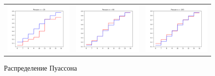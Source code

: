 	\begin{figure}[H]
		\centering
		\begin{tabular}{ccc}
			\includegraphics[width=55mm, height =0.25\textheight]{pics/emp_p_20.png}
			&
			\includegraphics[width=55mm, height =0.25\textheight]{pics/emp_p_60.png}
			&
			\includegraphics[width=55mm, height =0.25\textheight]{pics/emp_p_100.png}
		\end{tabular}
		\caption{Распределение Пуассона}
		\label{fig:poisson}
	\end{figure}


